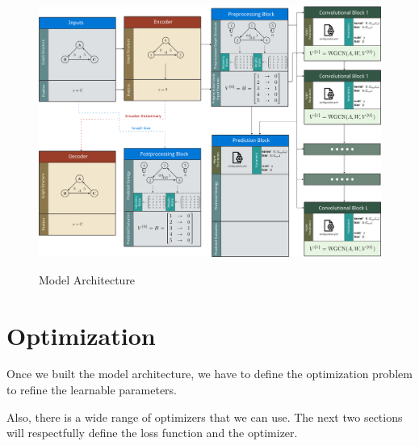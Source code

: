 \begin{landscape}

	\begin{figure}[H]
	\centering
		
		{\includegraphics[height=0.93\textheight]{Figures/Architecture.png}}
		\caption{Model Architecture}
		\label{fig:ModelArchitecture}
	\end{figure}
	
\end{landscape}

\section{Optimization}
Once we built the model architecture, we have to define the optimization problem to refine the learnable parameters.

Also, there is a wide range of optimizers that we can use. The next two sections will respectfully define the loss function and the optimizer.
